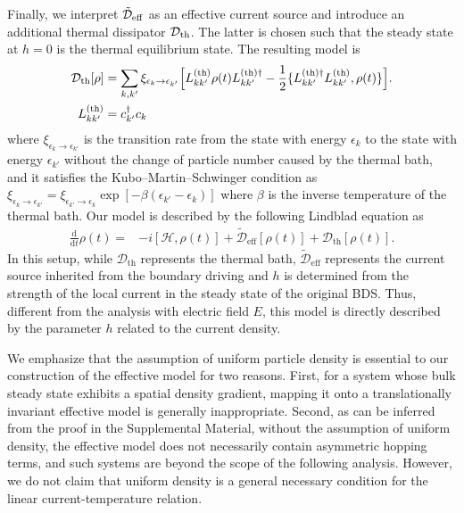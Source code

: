 \documentclass[a4paper, amsfonts, amssymb, amsmath, reprint, showkeys, nofootinbib, twoside,superscriptaddress, prb]{revtex4-2}
\newcommand{\m}[1]{\mathcal{#1}}
\newcommand{\mr}[1]{\mathrm{#1}}
\newcommand{\epk}{\epsilon_k}
\newcommand{\epkp}{\epsilon_{k'}}
\newcommand{\dt}{\frac{\mathrm{d}}{\mathrm{d}t}}
\begin{document}
Finally, we interpret $\tilde{\mathcal D}_{\rm eff}$ as an effective current source and introduce an additional thermal dissipator $\mathcal D_{\rm th}$. The latter is chosen such that the steady state at $h=0$ is the thermal equilibrium state. The resulting model is
\begin{align}
\m{D}_{\mr{th}}[\rho]& = \sum_{k, k'} \xi_{\epk\rightarrow\epkp}\Bigl[L^{(\mr{th})}_{kk'}\rho(t)L^{(\mr{th})\dagger}_{kk'} - \frac{1}{2}\{L^{(\mr{th})\dagger}_{kk'}L^{(\mr{th})}_{kk'}, \rho(t)\}\Bigr].\\
L^{(\mr{th})}_{kk'}& = c_{k'}^{\dagger} c_{k}\label{thermal_jump}
\end{align}
where $\xi_{\epk\rightarrow\epkp}$ is the transition rate from the state with energy $\epk$ to the state with energy $\epkp$ without the change of particle number caused by the thermal bath, and it satisfies the Kubo--Martin--Schwinger condition as $\xi_{\epk\rightarrow\epkp} = \xi_{\epkp\rightarrow\epk} \exp[-\beta(\epkp-\epk)]$ where $\beta$ is the inverse temperature of the thermal bath.
Our model is described by the following Lindblad equation as
\begin{align}
\dt \rho(t) =& -i[\m{H},\rho(t)] + \tilde{\m{D}}_{\mr{eff}}[\rho(t)] + \m{D}_{\mr{th}}[\rho(t)].\label{final_Lindblad}
\end{align}
In this setup, while $\m{D}_{\mr{th}}$ represents the thermal bath, $\tilde{\m{D}}_{\mr{eff}}$ represents the current source inherited from the boundary driving and $h$ is determined from the strength of the local current in the steady state of the original BDS. Thus, different from the analysis with electric field $E$, this model is directly described by the parameter $h$ related to the current density. 

We emphasize that the assumption of uniform particle density is essential to our construction of the effective model for two reasons. First, for a system whose bulk steady state exhibits a spatial density gradient, mapping it onto a translationally invariant effective model is generally inappropriate. Second, as can be inferred from the proof in the Supplemental Material, without the assumption of uniform density, the effective model does not
necessarily contain asymmetric hopping terms, and such systems are beyond the scope of the following analysis. However, we do not claim that uniform density is a general necessary condition for the linear current-temperature relation.
\end{document}
